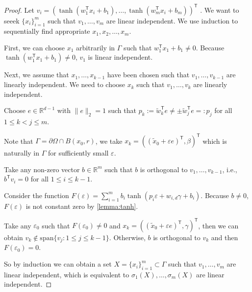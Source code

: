 \documentclass{article}
\newcommand{\T}{\mathsf{T}}
\begin{document}
\begin{proof}
    Let $v_{i}=(\tanh(w_{1}^\T x_{i}+b_1), \ldots, \tanh(w_{m}^\T x_{i}+b_m))^\T$ . We want to seeek $\{x_{i}\}_{i=1}^{m}$ such that $v_{1},\ldots,v_{m}$ are linear independent.
    We use induction to sequentially find appropriate \(x_{1}, x_{2}, \ldots, x_{m}\).

    First, we can choose \(x_{1}\) arbitrarily in \(\Gamma\) such that $w_{1}^\T x_{1}+b_{1}\neq 0$. Because $\tanh(w_{1}^\T x_{1}+b_{1})\neq 0$, $v_{1}$ is linear independent.
 
    Next, we assume that \(x_{1},\ldots,x_{k-1}\) have been chosen such that \(v_{1},\ldots,v_{k-1}\) are linearly independent.
    We need to choose \(x_{k}\) such that \(v_{1},\ldots,v_{k}\) are linearly independent.

    Choose $e\in \mathbb{R}^{d-1}$ with $\|e\|_{2}=1$ such that $p_{k}:=\tilde{w}_{k}^\T e\neq \pm\tilde{w}_{j}^\T e=:p_{j}$ for all $1\le k<j\le m$.

    Note that $\Gamma=\partial \Omega\cap B(x_0,r)$, we take $x_{k}=((\tilde{x}_{0}+\varepsilon e)^\T, \beta)^\T$ which is naturally in $\Gamma$ for sufficiently small $\varepsilon$.

    Take any non-zero vector $b\in \mathbb{R}^{m}$ such that $b$ is orthogonal to $v_{1},\ldots,v_{k-1}$, i.e., $b^\T v_{i}=0$ for all $1\le i\le k-1$.

    Consider the function $F(\varepsilon)=\sum_{i=1}^{m}b_{i}\tanh(p_{i}\varepsilon+w_{i,d}\gamma+b_i)$. Because $b\neq 0$, $F(\varepsilon)$ is not constant zero by \cref{lemma:tanh}.

    Take any $\varepsilon_{0}$ such that $F(\varepsilon_{0})\neq0$ and  $x_{k}=((\tilde{x}_{0}+\varepsilon e)^\T, \gamma)^\T$, then we can obtain $v_{k} \notin \text{span}\{v_{j}:1\le j\le k-1\}$. Otherwise, $b$ is orthogonal to $v_{k}$ and then $F(\varepsilon_{0})=0$.

    So by induction we can obtain a set $X=\{x_{i}\}_{i=1}^{m}\subset \Gamma$ such that $v_{1},\ldots,v_{m}$ are linear independent, which is equivalent to $\sigma_{1}(X),\ldots,\sigma_{m}(X)$ are linear independent.

\end{proof}
\end{document}
